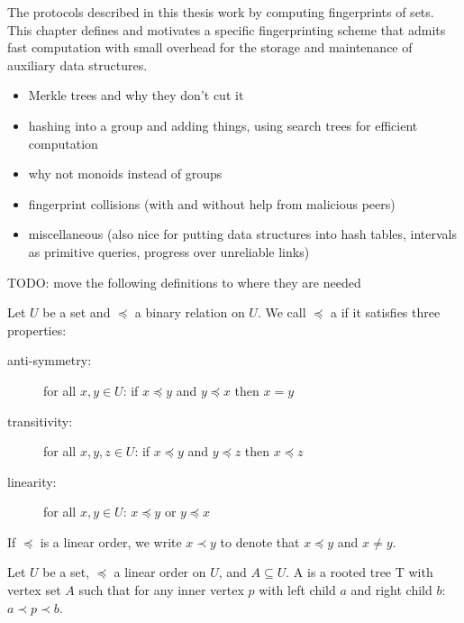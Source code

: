 
The protocols described in this thesis work by computing fingerprints of sets.
This chapter defines and motivates a specific fingerprinting scheme that admits fast computation with small overhead for the storage and maintenance of auxiliary data structures.

\begin{itemize}
  \item Merkle trees and why they don't cut it
  \item hashing into a group and adding things, using search trees for efficient computation
  \item why not monoids instead of groups
  \item fingerprint collisions (with and without help from malicious peers)
  \item miscellaneous (also nice for putting data structures into hash tables, intervals as primitive queries, progress over unreliable links)
\end{itemize}


TODO: move the following definitions to where they are needed

\begin{definition}
Let $U$ be a set and $\preceq$ a binary relation on $U$.
We call $\preceq$ a  if it satisfies three properties:

  \begin{description}
    \item[anti-symmetry:] for all $x, y \in U$: if $x \preceq y$ and $y \preceq x$ then $x = y$
    \item[transitivity:] for all $x, y, z \in U$: if $x \preceq y$ and $y \preceq z$ then $x \preceq z$
    \item[linearity:] for all $x, y \in U$: $x \preceq y$ or $y \preceq x$
  \end{description}

If $\preceq$ is a linear order, we write $x \prec y$ to denote that $x \preceq y$ and $x \neq y$.
\end{definition}

\begin{definition}
Let $U$ be a set, $\preceq$ a linear order on $U$, and $A \subseteq U$.
A  is a rooted tree T with vertex set $A$ such that for any inner vertex $p$ with left child $a$ and right child $b$: $a \prec p \prec b$.
\end{definition}

